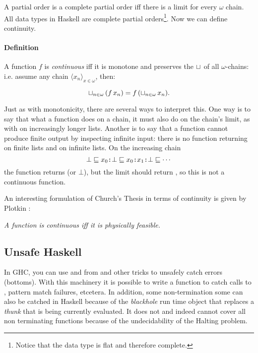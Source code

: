 A partial order is a complete partial order iff there is a limit for
every $\omega$ chain. All data types in Haskell are complete partial
orders\footnote{Notice that the data type  is flat and therefore complete.}. Now we can
define continuity.

\paragraph{Definition} A function $f$ is \emph{continuous} iff it is
monotone and preserves the $\sqcup_{}$ of all $\omega$-chains: i.e.
assume any chain $\langle x_n \rangle_{x \in \omega}$, then:

\begin{equation*}
\sqcup_{n \in \omega} \, (f \, x_n) = f \, (\sqcup_{n \in \omega} \, x_n).
\end{equation*}

Just as with monotonicity, there are several ways to interpret
this. One way is to say that what a function does on a chain, it must
also do on the chain's limit, as with  on increasingly longer
lists. Another is to say that a function cannot produce finite output by
inspecting infinite input: there is no function
 returning  on finite lists and
 on infinite lists. On the increasing chain
$$ \bot \sqsubseteq x_0 \hs{:} \bot \sqsubseteq x_0 \hs{:} x_1 \hs{:} \bot
\sqsubseteq \cdots$$
the function  returns  (or $\bot$), but the
limit should return , so this is not a continuous function.

An interesting formulation of Church's Thesis in terms of continuity
is given by Plotkin \cite{domains}:

\begin{center}
\emph{A function is continuous iff it is physically feasible.}
\end{center}

\subsection{Unsafe Haskell}
In GHC, you can use  and  from
 and other tricks to unsafely catch errors
(bottoms). With this machinery it is possible to write a function
 to catch calls to , pattern
match failures, etcetera. In addition, some non-termination some can
also be catched in Haskell because of the \emph{blackhole} run time
object that replaces a \emph{thunk} that is being currently
evaluated. It does not and indeed cannot cover all non terminating
functions because of the undecidability of the Halting problem.


